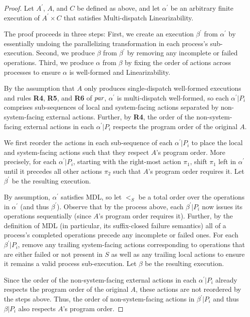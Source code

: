 \begin{proof}
  Let $A^\prime$, $A$, and $C$ be defined as above, and let $\alpha^\prime$ be an arbitrary finite execution of $A^\prime \times C$ that satisfies Multi-dispatch Linearizability.

  The proof proceeds in three steps: First, we create an execution $\beta^\prime$ from $\alpha^\prime$ by essentially undoing the parallelizing transformation in each process's sub-execution. Second, we produce $\beta$ from $\beta^\prime$ by removing any incomplete or failed operations. Third, we produce $\alpha$ from $\beta$ by fixing the order of actions across processes to ensure $\alpha$ is well-formed and Linearizability.

  By the assumption that $A$ only produces single-dispatch well-formed executions and rules \textbf{R4}, \textbf{R5}, and \textbf{R6} of $\operatorname*{\textit{par}}$, $\alpha^\prime$ is multi-dispatch well-formed, so each $\alpha^\prime | P_i$ comprises sub-sequences of local and system-facing actions separated by non-system-facing external actions. Further, by \textbf{R4}, the order of the non-system-facing external actions in each $\alpha^\prime | P_i$ respects the program order of the original $A$.

  We first reorder the actions in each sub-sequence of each $\alpha^\prime | P_i$ to place the local and system-facing actions such that they respect $A$'s program order. More precisely, for each $\alpha^\prime | P_i$, starting with the right-most action $\pi_1$, shift $\pi_1$ left in $\alpha^\prime$ until it precedes all other actions $\pi_2$ such that $A$'s program order requires it. Let $\beta^\prime$ be the resulting execution.

  By assumption, $\alpha^\prime$ satisfies MDL, so let $<_S$ be a total order over the operations in $\alpha^\prime$ (and thus $\beta^\prime$). Observe that by the process above, each $\beta^\prime | P_i$ now issues its operations sequentially (since $A$'s program order requires it). Further, by the definition of MDL (in particular, its suffix-closed failure semantics) all of a process's completed operations precede any incomplete or failed ones. For each $\beta^\prime | P_i$, remove any trailing system-facing actions corresponding to operations that are either failed or not present in $S$ as well as any trailing local actions to ensure it remains a valid process sub-execution. Let $\beta$ be the resulting execution.

  Since the order of the non-system-facing external actions in each $\alpha^\prime | P_i$ already respects the program order of the original $A$, these actions are not reordered by the steps above. Thus, the order of non-system-facing actions in $\beta^\prime | P_i$ and thus $\beta | P_i$ also respects $A$’s program order. 


\end{proof}
